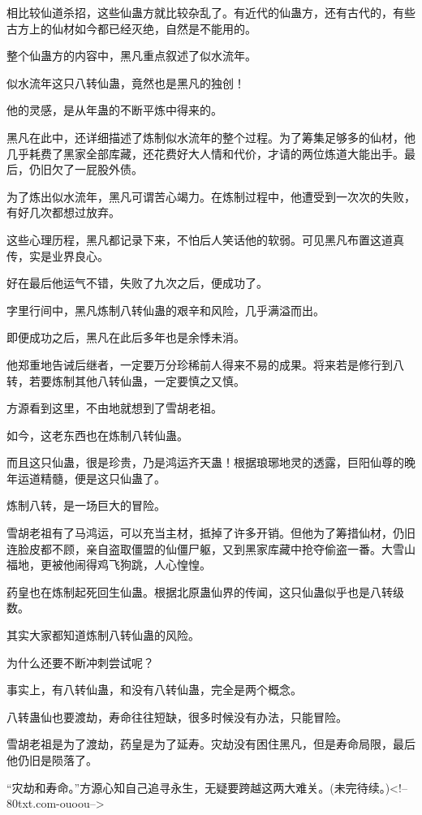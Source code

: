 \begin{this_body}
相比较仙道杀招，这些仙蛊方就比较杂乱了。有近代的仙蛊方，还有古代的，有些古方上的仙材如今都已经灭绝，自然是不能用的。

整个仙蛊方的内容中，黑凡重点叙述了似水流年。

似水流年这只八转仙蛊，竟然也是黑凡的独创！

他的灵感，是从年蛊的不断平炼中得来的。

黑凡在此中，还详细描述了炼制似水流年的整个过程。为了筹集足够多的仙材，他几乎耗费了黑家全部库藏，还花费好大人情和代价，才请的两位炼道大能出手。最后，仍旧欠了一屁股外债。

为了炼出似水流年，黑凡可谓苦心竭力。在炼制过程中，他遭受到一次次的失败，有好几次都想过放弃。

这些心理历程，黑凡都记录下来，不怕后人笑话他的软弱。可见黑凡布置这道真传，实是业界良心。

好在最后他运气不错，失败了九次之后，便成功了。

字里行间中，黑凡炼制八转仙蛊的艰辛和风险，几乎满溢而出。

即便成功之后，黑凡在此后多年也是余悸未消。

他郑重地告诫后继者，一定要万分珍稀前人得来不易的成果。将来若是修行到八转，若要炼制其他八转仙蛊，一定要慎之又慎。

方源看到这里，不由地就想到了雪胡老祖。

如今，这老东西也在炼制八转仙蛊。

而且这只仙蛊，很是珍贵，乃是鸿运齐天蛊！根据琅琊地灵的透露，巨阳仙尊的晚年运道精髓，便是这只仙蛊了。

炼制八转，是一场巨大的冒险。

雪胡老祖有了马鸿运，可以充当主材，抵掉了许多开销。但他为了筹措仙材，仍旧连脸皮都不顾，亲自盗取僵盟的仙僵尸躯，又到黑家库藏中抢夺偷盗一番。大雪山福地，更被他闹得鸡飞狗跳，人心惶惶。

药皇也在炼制起死回生仙蛊。根据北原蛊仙界的传闻，这只仙蛊似乎也是八转级数。

其实大家都知道炼制八转仙蛊的风险。

为什么还要不断冲刺尝试呢？

事实上，有八转仙蛊，和没有八转仙蛊，完全是两个概念。

八转蛊仙也要渡劫，寿命往往短缺，很多时候没有办法，只能冒险。

雪胡老祖是为了渡劫，药皇是为了延寿。灾劫没有困住黑凡，但是寿命局限，最后他仍旧是陨落了。

“灾劫和寿命。”方源心知自己追寻永生，无疑要跨越这两大难关。(未完待续。)<!--80txt.com-ouoou-->

\end{this_body}

